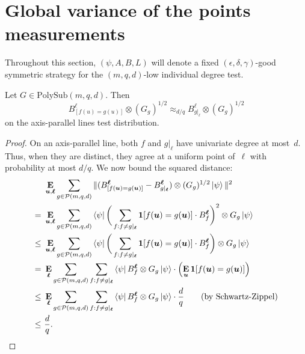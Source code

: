 \documentclass[11pt]{article}
\theoremstyle{definition}
\newcommand{\E}{\mathop{\bf E\/}}
\newcommand{\eps}{\epsilon}
\newcommand{\calP}{\mathcal{P}}
\newcommand{\bone}{\boldsymbol{1}}
\newcommand{\bell}{\boldsymbol{\ell}}
\newcommand{\bu}{\boldsymbol{u}}
\newcommand{\polyfunc}[3]{\calP(#1, #2, #3)}
\newcommand{\polysub}[3]{\mathrm{PolySub}(#1, #2, #3)}
\begin{document}
\section{Global variance of the points measurements}
\label{sec:variance}
Throughout this section, $(\psi, A, B, L)$ will denote a fixed $(\eps, \delta, \gamma)$-good symmetric strategy for the $(m,q,d)$-low individual degree test.

\begin{lemma}\label{lem:generalize-b}
Let $G \in \polysub{m}{q}{d}$. Then
\begin{equation*}
B^\ell_{[f(u) = g(u)]} \otimes (G_g)^{1/2} \approx_{d/q} B^\ell_{g|_\ell} \otimes (G_g)^{1/2}
\end{equation*}
on the axis-parallel lines test distribution.
\end{lemma}
\begin{proof}
On an axis-parallel line, both $f$ and $g|_\ell$ have univariate
degree at most~$d$.  Thus, when they are distinct, they agree at a
uniform point of~$\ell$ with probability at most $d/q$.
We now bound the squared distance:
\begin{align*}
&~\E_{\bu, \bell} \sum_{g \in \polyfunc{m}{q}{d}} \Vert (B^{\bell}_{[f(\bu) = g(\bu)]}  - B^{\bell}_{g|_{\bell}}) \otimes (G_g)^{1/2} \ket{\psi}\Vert^2\\
=&~\E_{\bu, \bell} \sum_{g \in \polyfunc{m}{q}{d}} \bra{\psi} \bigg(\sum_{f : f \neq g|_{\bell}} \bone[f(\bu) = g(\bu)] \cdot B^{\bell}_f\bigg)^2 \otimes G_g \ket{\psi}\\
\leq&~\E_{\bu, \bell} \sum_{g \in \polyfunc{m}{q}{d}} \bra{\psi} \bigg(\sum_{f : f \neq g|_{\bell}} \bone[f(\bu) = g(\bu)] \cdot B^{\bell}_f\bigg) \otimes G_g \ket{\psi} \\
= &~\E_{\bell} \sum_{g \in \polyfunc{m}{q}{d}} \sum_{f : f \neq g|_{\bell}} \bra{\psi}  B^{\bell}_f \otimes G_g \ket{\psi} \cdot \left( \E_{\bu} \bone[f(\bu) = g(\bu)]\right)\\
\leq &~\E_{\bell} \sum_{g \in \polyfunc{m}{q}{d}} \sum_{f : f \neq g|_{\bell}} \bra{\psi}  B^{\bell}_f \otimes G_g \ket{\psi} \cdot \frac{d}{q}\tag{by Schwartz-Zippel}\\
\leq &~\frac{d}{q}.\qedhere
\end{align*}
\end{proof}
\end{document}

